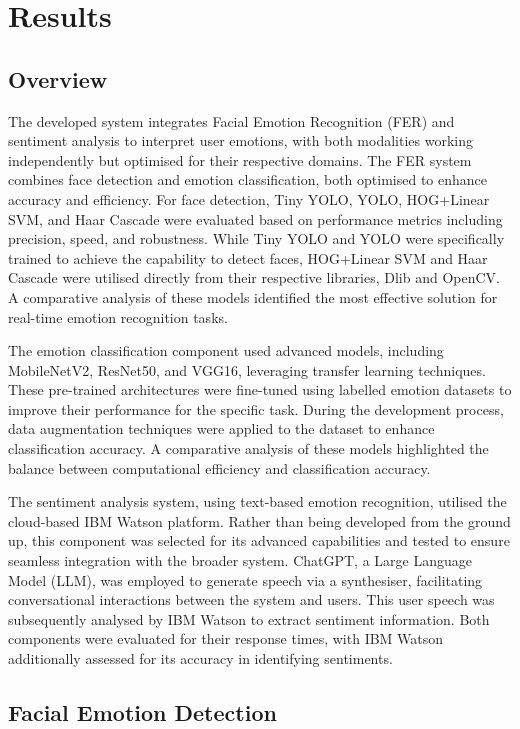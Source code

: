 \chapter{Results}

\section{Overview}

The developed system integrates Facial Emotion Recognition (FER) and sentiment analysis to interpret user emotions, with both modalities working independently but optimised for their respective domains. The FER system combines face detection and emotion classification, both optimised to enhance accuracy and efficiency. For face detection,  Tiny YOLO, YOLO, HOG+Linear SVM, and Haar Cascade were evaluated based on performance metrics including precision, speed, and robustness. While Tiny YOLO and YOLO were specifically trained to achieve the capability to detect faces, HOG+Linear SVM and Haar Cascade were utilised directly from their respective libraries, Dlib and OpenCV. A comparative analysis of these models identified the most effective solution for real-time emotion recognition tasks.

The emotion classification component used advanced models, including MobileNetV2, ResNet50, and VGG16, leveraging transfer learning techniques. These pre-trained architectures were fine-tuned using labelled emotion datasets to improve their performance for the specific task. During the development process, data augmentation techniques were applied to the dataset to enhance classification accuracy. A comparative analysis of these models highlighted the balance between computational efficiency and classification accuracy.

The sentiment analysis system, using text-based emotion recognition, utilised the cloud-based IBM Watson platform. Rather than being developed from the ground up, this component was selected for its advanced capabilities and tested to ensure seamless integration with the broader system. ChatGPT, a Large Language Model (LLM), was employed to generate speech via a synthesiser, facilitating conversational interactions between the system and users. This user speech was subsequently analysed by IBM Watson to extract sentiment information. Both components were evaluated for their response times, with IBM Watson additionally assessed for its accuracy in identifying sentiments.

\section{Facial Emotion Detection}

